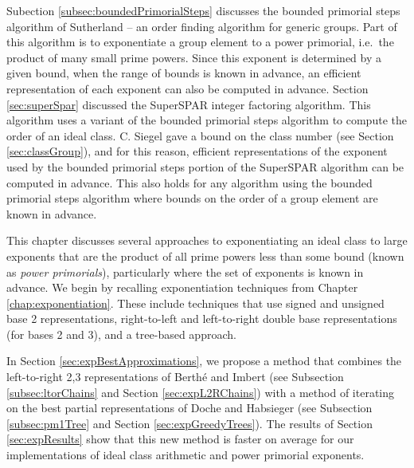 \documentclass{ucalgthes1}
\theoremstyle{definition}
\begin{document}
Subection \ref{subsec:boundedPrimorialSteps} discusses the bounded primorial steps algorithm of Sutherland \cite[\S 4.1]{Sutherland2007} -- an order finding algorithm for generic groups.  Part of this algorithm is to exponentiate a group element to a power primorial, i.e.\ the product of many small prime powers.  Since this exponent is determined by a given bound, when the range of bounds is known in advance, an efficient representation of each exponent can also be computed in advance.  Section \ref{sec:superSpar} discussed the SuperSPAR integer factoring algorithm.  This algorithm uses a variant of the bounded primorial steps algorithm to compute the order of an ideal class.  C. Siegel \cite[p.247]{Crandall2001} gave a bound on the class number (see Section \ref{sec:classGroup}), and for this reason, efficient representations of the exponent used by the bounded primorial steps portion of the SuperSPAR algorithm can be computed in advance.  This also holds for any algorithm using the bounded primorial steps algorithm where bounds on the order of a group element are known in advance.

This chapter discusses several approaches to exponentiating an ideal class to large exponents that are the product of all prime powers less than some bound (known as \emph{power primorials}), particularly where the set of exponents is known in advance.  We begin by recalling exponentiation techniques from Chapter \ref{chap:exponentiation}.  These include techniques that use signed and unsigned base 2 representations, right-to-left and left-to-right double base representations (for bases 2 and 3), and a tree-based approach.  

In Section \ref{sec:expBestApproximations}, we propose a method that combines the left-to-right 2,3 representations of Berth{\'e} and Imbert \cite{Berthe2009} (see Subsection \ref{subsec:ltorChains} and Section \ref{sec:expL2RChains}) with a method of iterating on the best partial representations of Doche and Habsieger \cite{Doche2008} (see Subsection \ref{subsec:pm1Tree} and Section \ref{sec:expGreedyTrees}).  The results of Section \ref{sec:expResults} show that this new method is faster on average for our implementations of ideal class arithmetic and power primorial exponents.
\end{document}
